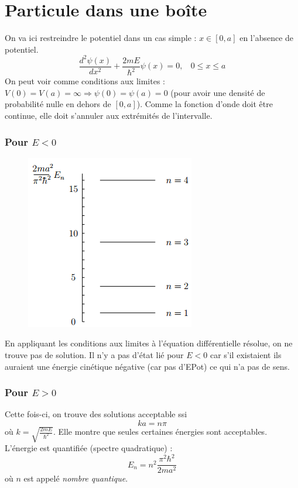 \documentclass	[11pt, a4paper, openany]{book}
\begin{document}
	\section{Particule dans une boîte}
	On va ici restreindre le potentiel dans un cas simple : $x \in [0,a]$ en l'absence de potentiel.
	\begin{equation}
		\frac{d^2\psi(x)}{dx^2} + \frac{2mE}{\hbar^2}\psi(x) = 0, \ \ \ \ 0\leq x \leq a
	\end{equation}
	On peut voir comme conditions aux limites : $V(0) = V(a) = \infty \Rightarrow \psi(0) = \psi(a) = 0$ (pour avoir une densité de probabilité nulle en dehors de $[0,a]$). Comme la fonction d'onde doit être continue, elle doit s'annuler aux extrémités de l'intervalle.
	
	\subsubsection*{Pour $E < 0$}
	\begin{figure}
		\includegraphics[scale=0.5]{img/image4.png}
	\end{figure}
	En appliquant les conditions aux limites à l'équation différentielle résolue, on ne trouve pas de solution. Il n'y a pas d'état lié pour $E < 0$ car s'il existaient ils auraient une énergie cinétique négative (car pas d'EPot) ce qui n'a pas de sens.
	
	\subsubsection*{Pour $E > 0$}
	Cette fois-ci, on trouve des solutions acceptable ssi
	\begin{equation}
		ka = n\pi
	\end{equation}
	où $k = \sqrt{\frac{2mE}{\hbar^2}}$. Elle montre que seules certaines énergies sont acceptables. L'énergie est quantifiée (spectre quadratique) :
	\begin{equation}
		E_n = n^2 \frac{\pi^2\hbar^2}{2ma^2}
	\end{equation}
	où $n$ est appelé \textit{nombre quantique}.\\
	
\end{document}

